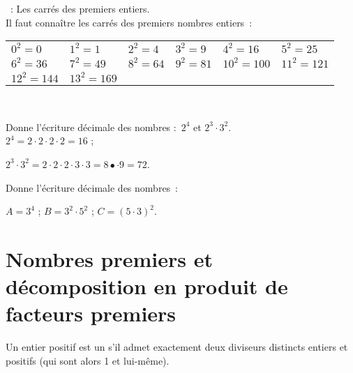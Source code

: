 \vspace{4em}

\begin{methode*1}

\begin{exemple*1}
 : Les carrés des premiers entiers. \\[1em]
Il faut connaître les carrés des premiers nombres entiers : 

\begin{tabularx}{0.7\textwidth}{llllll}
$0^2 = 0$	& $1^2 = 1$ & $2^2 = 4$ & $3^2 = 9$ & $4^2 = 16$ & $5^2 = 25$ \\
$6^2 = 36$ & $7^2 = 49$ & $8^2 = 64$ & $9^2 = 81$ & $10^2 = 100$ & $11^2 = 121$ \\ 
$12^2 = 144$ & $13^2 = 169$ & & & & \\
 \end{tabularx} \\
 \end{exemple*1}

\begin{exemple*1}
Donne l'écriture décimale des nombres : $2^4$ et $2^3 \cdot 3^2$. \\[1em]
$2^4 =  2 \cdot 2 \cdot 2 \cdot 2 = 16$ ;

$2^3 \cdot 3^2 = 2 \cdot 2 \cdot 2 \cdot 3 \cdot 3 = 8 •\cdot 9 = 72$.
 \end{exemple*1}

\exercice  
Donne l'écriture décimale des nombres : 

$A = 3^4$ ; $B = 3^2 \cdot 5^2$ ; $C = (5 \cdot 3)^2$.

\vspace{6em}


 \end{methode*1}
 
 

\newpage

\section{Nombres premiers et décomposition en produit de facteurs premiers}


\vspace{6em}

\begin{definition}
Un entier positif est un  s'il admet exactement deux diviseurs distincts entiers et positifs (qui sont alors 1 et lui-même).
\end{definition}

